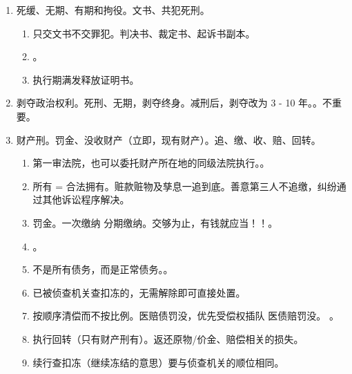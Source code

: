 \begin{enumerate}
\begin{enumerate}
\begin{enumerate}
                  \item 从裁判宣告 \hz 送达之日起算考验期。
                  \item 减刑。2 年期满 \yjt 无期。重大立功  年有期。2 年期满起算。即刑期最低为 25 + 2 = 27。
                  \item 限制减刑（只针对死刑）。累犯、杀伤奸抢投毒火爆、绑架、有组织的暴力性犯罪。
                  \item 转死刑。2 年内故意犯罪、情节恶劣、层报核准。
                \end{enumerate}
        \end{enumerate}
  \item 死缓、无期、有期和拘役。文书、共犯死刑。
        \begin{enumerate}
          \item {}只交文书不交罪犯。判决书、裁定书、起诉书副本。
          \item {}。
          \item 执行期满发释放证明书。
        \end{enumerate}
  \item 剥夺政治权利。死刑、无期，剥夺终身。减刑后，剥夺改为 3 - 10 年。。不重要。
  \item 财产刑。罚金、没收财产（立即，现有财产）。追、缴、收、赔、回转。
        \begin{enumerate}
          \item 第一审法院，也可以委托财产所在地的同级法院执行。。
          \item 所有 = 合法拥有。赃款赃物及孳息一追到底。善意第三人不追缴，纠纷通过其他诉讼程序解决。
          \item 罚金。一次缴纳 \hz 分期缴纳。交够为止，有钱就应当！！。
          \item {}。
          \item 不是所有债务，而是正常债务。。
          \item 已被侦查机关查扣冻的，无需解除即可直接处置。
          \item 按顺序清偿而不按比例。医赔债罚没，优先受偿权插队 \yjt 医债赔罚没。
                。
          \item 执行回转（只有财产刑有）。返还原物/价金、赔偿相关的损失。
          \item 续行查扣冻（继续冻结的意思）要与侦查机关的顺位相同。

\end{enumerate}
\end{enumerate}
